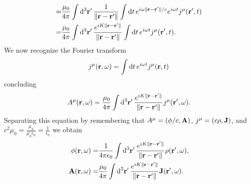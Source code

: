 \documentclass{article}
\begin{document}
\begin{enumerate}[(i)]
\begin{align}
\begin{split}
=&\frac{\mu_0}{4\pi}\int \dd[3]{\vb{r}'}\frac{1}{\|\vb{r}-\vb{r}'\|}\int\dd{t}e^{i\omega\|\vb{r}-\vb{r}'\|/c}e^{i\omega t}j^\mu(\vb{r}',t)\\
=&\frac{\mu_0}{4\pi}\int \dd[3]{\vb{r}'}\frac{e^{iK\|\vb{r}-\vb{r}'\|}}{\|\vb{r}-\vb{r}'\|}\int\dd{t}e^{i\omega t}j^\mu(\vb{r}',t).
\end{split}
\end{align}
We now recognize the Fourier transform
\begin{equation}\label{ec:fourier_current}
j^\mu(\vb{r},\omega)=\int\dd{t}e^{i\omega t}j^\mu(\vb{r},t)
\end{equation}
concluding
\begin{equation}
A^\mu(\vb{r},\omega)=\frac{\mu_0}{4\pi}\int \dd[3]{\vb{r}'}\frac{e^{iK\|\vb{r}-\vb{r}'\|}}{\|\vb{r}-\vb{r}'\|}j^\mu(\vb{r}',\omega).
\end{equation}
Separating this equation by remembering that $A^\mu=(\phi/c,\vb{A})$, $j^\mu=(c\rho,\vb{J})$, and $c^2\mu_0=\frac{\mu_0}{\mu_0\epsilon_0}=\frac{1}{\epsilon_0}$ we obtain
\begin{align}\label{ec:fourier_vector_potential}
\begin{split}
\phi(\vb{r},\omega)=&\frac{1}{4\pi\epsilon_0}\int \dd[3]{\vb{r}'}\frac{e^{iK\|\vb{r}-\vb{r}'\|}}{\|\vb{r}-\vb{r}'\|}\rho(\vb{r}',\omega),\\
\vb{A}(\vb{r},\omega)=&\frac{\mu_0}{4\pi}\int \dd[3]{\vb{r}'}\frac{e^{iK\|\vb{r}-\vb{r}'\|}}{\|\vb{r}-\vb{r}'\|}\vb{J}(\vb{r}',\omega).
\end{split}
\end{align}


\end{enumerate}
\end{document}

